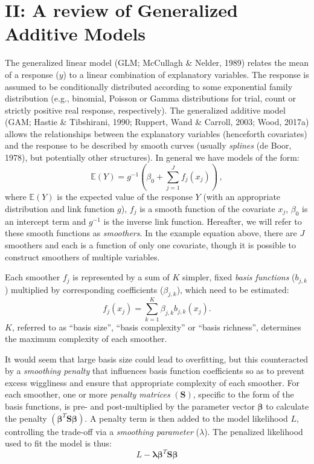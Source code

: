 \documentclass[12pt]{article}
\begin{document}
\FloatBarrier

\section{II: A review of Generalized Additive
Models}\label{ii-a-review-of-generalized-additive-models}

The generalized linear model (GLM; McCullagh \& Nelder, 1989) relates
the mean of a response (\(y\)) to a linear combination of explanatory
variables. The response is assumed to be conditionally distributed
according to some exponential family distribution (e.g., binomial,
Poisson or Gamma distributions for trial, count or strictly positive
real response, respectively). The generalized additive model (GAM;
Hastie \& Tibshirani, 1990; Ruppert, Wand \& Carroll, 2003; Wood, 2017a)
allows the relationships between the explanatory variables (henceforth
covariates) and the response to be described by smooth curves (usually
\emph{splines} (de Boor, 1978), but potentially other structures). In
general we have models of the form: \[
\mathbb{E}\left( Y \right) = g^{-1}\left( \beta_0 + \sum_{j=1}^J f_j(x_j) \right)\,,
\] where \(\mathbb{E}(Y)\) is the expected value of the response \(Y\)
(with an appropriate distribution and link function \(g\)), \(f_j\) is a
smooth function of the covariate \(x_j\), \(\beta_0\) is an intercept
term and \(g^{-1}\) is the inverse link function. Hereafter, we will
refer to these smooth functions as \emph{smoothers}. In the example
equation above, there are \(J\) smoothers and each is a function of only
one covariate, though it is possible to construct smoothers of multiple
variables.

Each smoother \(f_j\) is represented by a sum of \(K\) simpler, fixed
\emph{basis functions} (\(b_{j,k}\)) multiplied by corresponding
coefficients (\(\beta_{j,k}\)), which need to be estimated: \[
f_j(x_j) = \sum_{k=1}^K \beta_{j,k} b_{j,k}(x_j).
\] \(K\), referred to as ``basis size'', ``basis complexity'' or ``basis
richness'', determines the maximum complexity of each smoother.

It would seem that large basis size could lead to overfitting, but this
counteracted by a \emph{smoothing penalty} that influences basis
function coefficients so as to prevent excess wiggliness and ensure that
appropriate complexity of each smoother. For each smoother, one or more
\emph{penalty matrices} \((\mathbf{S})\), specific to the form of the
basis functions, is pre- and post-multiplied by the parameter vector
\(\boldsymbol{\beta}\) to calculate the penalty
\((\boldsymbol{\beta}^T \mathbf{S} \boldsymbol{\beta})\). A penalty term
is then added to the model likelihood \(L\), controlling the trade-off
via a \emph{smoothing parameter} (\(\lambda\)). The penalized likelihood
used to fit the model is thus: \[
L - \boldsymbol{\lambda} \boldsymbol{\beta}^T \mathbf{S} \boldsymbol{\beta}
\]
\end{document}
